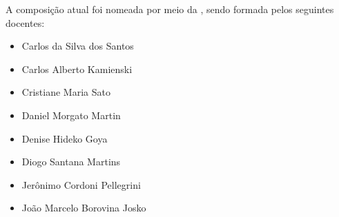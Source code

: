 A composição atual foi nomeada por meio da , sendo
formada pelos seguintes docentes:
\begin{itemize}
    \item Carlos da Silva dos Santos
    \item Carlos Alberto Kamienski
    \item Cristiane Maria Sato
    \item Daniel Morgato Martin
    \item Denise Hideko Goya
    \item Diogo Santana Martins
    \item Jerônimo Cordoni Pellegrini
    \item João Marcelo Borovina Josko
\end{itemize}

